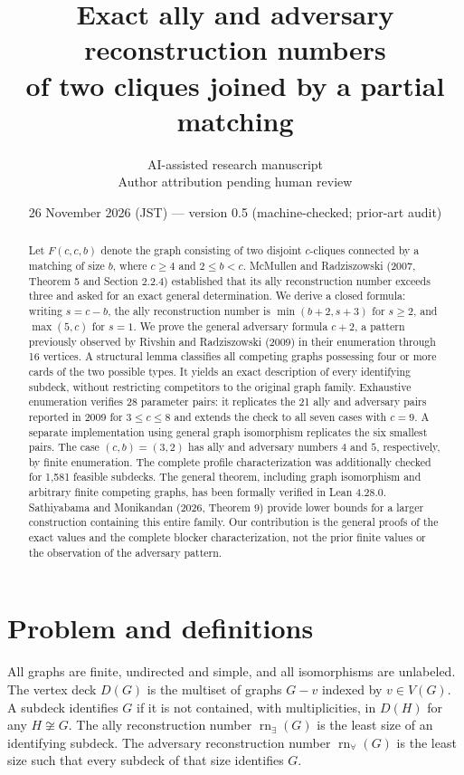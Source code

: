 \documentclass[11pt]{article}
\title{Exact ally and adversary reconstruction numbers\\of two cliques joined by a partial matching}
\author{AI-assisted research manuscript\\Author attribution pending human review}
\date{26 November 2026 (JST) --- version 0.5 (machine-checked; prior-art audit)}
\newcommand{\rn}{\operatorname{rn}}
\begin{document}
\maketitle
\begin{abstract}
Let $F(c,c,b)$ denote the graph consisting of two disjoint $c$-cliques connected by a matching of size $b$, where $c\geq4$ and $2\leq b<c$. McMullen and Radziszowski (2007, Theorem 5 and Section 2.2.4) established that its ally reconstruction number exceeds three and asked for an exact general determination. We derive a closed formula: writing $s=c-b$, the ally reconstruction number is $\min(b+2,s+3)$ for $s\geq2$, and $\max(5,c)$ for $s=1$. We prove the general adversary formula $c+2$, a pattern previously observed by Rivshin and Radziszowski (2009) in their enumeration through 16 vertices. A structural lemma classifies all competing graphs possessing four or more cards of the two possible types. It yields an exact description of every identifying subdeck, without restricting competitors to the original graph family. Exhaustive enumeration verifies 28 parameter pairs: it replicates the 21 ally and adversary pairs reported in 2009 for $3\leq c\leq8$ and extends the check to all seven cases with $c=9$. A separate implementation using general graph isomorphism replicates the six smallest pairs. The case $(c,b)=(3,2)$ has ally and adversary numbers $4$ and $5$, respectively, by finite enumeration. The complete profile characterization was additionally checked for 1,581 feasible subdecks. The general theorem, including graph isomorphism and arbitrary finite competing graphs, has been formally verified in Lean 4.28.0. Sathiyabama and Monikandan (2026, Theorem 9) provide lower bounds for a larger construction containing this entire family. Our contribution is the general proofs of the exact values and the complete blocker characterization, not the prior finite values or the observation of the adversary pattern.
\end{abstract}
\section{Problem and definitions}
All graphs are finite, undirected and simple, and all isomorphisms are unlabeled. The vertex deck $D(G)$ is the multiset of graphs $G-v$ indexed by $v\in V(G)$. A subdeck identifies $G$ if it is not contained, with multiplicities, in $D(H)$ for any $H\not\cong G$. The ally reconstruction number $\rn_\exists(G)$ is the least size of an identifying subdeck. The adversary reconstruction number $\rn_\forall(G)$ is the least size such that every subdeck of that size identifies $G$.
\end{document}
